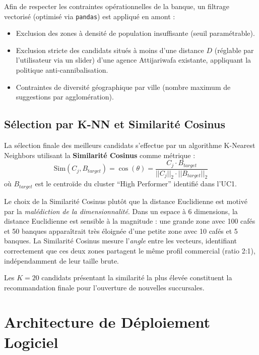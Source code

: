 \documentclass[11pt,a4paper,twoside]{report}
\begin{document}
Afin de respecter les contraintes opérationnelles de la banque, un filtrage vectorisé (optimisé via \texttt{pandas}) est appliqué en amont :
\begin{itemize}
    \item Exclusion des zones à densité de population insuffisante (seuil paramétrable).
    \item Exclusion stricte des candidats situés à moins d'une distance $D$ (réglable par l'utilisateur via un slider) d'une agence Attijariwafa existante, appliquant la politique anti-cannibalisation.
    \item Contraintes de diversité géographique par ville (nombre maximum de suggestions par agglomération).
\end{itemize}

\subsection{Sélection par K-NN et Similarité Cosinus}

La sélection finale des meilleurs candidats s'effectue par un algorithme K-Nearest Neighbors utilisant la \textbf{Similarité Cosinus} comme métrique :
\begin{equation}
\text{Sim}(C_j, B_{target}) = \cos(\theta) = \frac{C_j \cdot B_{target}}{||C_j||_2 \cdot ||B_{target}||_2}
\end{equation}
où $B_{target}$ est le centroïde du cluster ``High Performer'' identifié dans l'UC1.

Le choix de la Similarité Cosinus plutôt que la distance Euclidienne est motivé par la \textit{malédiction de la dimensionnalité}. Dans un espace à 6 dimensions, la distance Euclidienne est sensible à la magnitude : une grande zone avec 100 cafés et 50 banques apparaîtrait très éloignée d'une petite zone avec 10 cafés et 5 banques. La Similarité Cosinus mesure l'\textit{angle} entre les vecteurs, identifiant correctement que ces deux zones partagent le même profil commercial (ratio 2:1), indépendamment de leur taille brute.

Les $K=20$ candidats présentant la similarité la plus élevée constituent la recommandation finale pour l'ouverture de nouvelles succursales.

\section{Architecture de Déploiement Logiciel}
\end{document}
